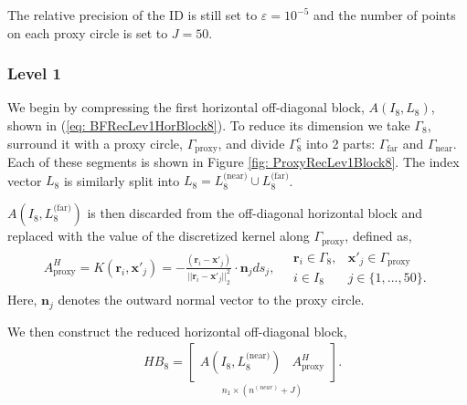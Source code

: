 \documentclass{sfuthesis}
\begin{document}
The relative precision of the ID is still set to $\varepsilon=10^{-5}$ and the number of points on each proxy circle is set to $J=50$. 


\subsubsection{Level 1}
We begin by compressing the first horizontal off-diagonal block, $A(I_8, L_8)$, shown in (\ref{eq: BFRecLev1HorBlock8}). 
To reduce its dimension we take $\Gamma_8$, surround it with a proxy circle, $\Gamma_{\text{proxy}}$, and divide $\Gamma_8^c$ into 2 parts: $\Gamma_{\text{far}}$ and $\Gamma_{\text{near}}$. Each of these segments is shown in Figure \ref{fig: ProxyRecLev1Block8}.
The index vector $L_8$ is similarly split into $L_8=L_8^{\text{(near)}} \cup L_8^{\text{(far)}}$.

$A(I_8, L_8^{\text{(far)}})$ is then discarded from the off-diagonal horizontal block and replaced with the value of the discretized kernel along $\Gamma_{\text{proxy}}$, defined as, 
\begin{align*}
	A_{\text{proxy}}^H=K(\mathbf{r}_i, \mathbf{x}'_j)=-\frac{(\mathbf{r}_i-\mathbf{x}'_j)}{{||\mathbf{r}_i-\mathbf{x}'_j||}_2^2}\cdot \mathbf{n}_j ds_j, \quad \begin{array}{cc} 
	\mathbf{r}_i \in \Gamma_8, &\mathbf{x}'_j \in \Gamma_{\text{proxy}}\\
	i \in I_8 &j \in \{1, ..., 50\}.
\end{array}
\end{align*}
Here, $\mathbf{n}_j$ denotes the outward normal vector to the proxy circle. 

We then construct the reduced horizontal off-diagonal block, 
\begin{align*}
	&HB_8=\underset{n_1 \times (n^{(near)}+J)}{\left[\begin{array}{cc}
	A(I_8, L_8^{\text{(near)}}) & A_{\text{proxy}}^H
	\end{array}\right]}.
\end{align*}
\end{document}
